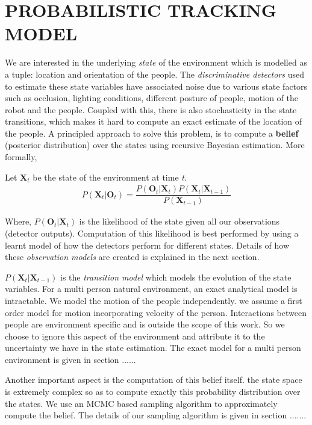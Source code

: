 \section{PROBABILISTIC TRACKING MODEL}
We are interested in the underlying \textit{state} of the environment which is modelled as a tuple: location and orientation of the people. The \textit{discriminative detectors} used to estimate these state variables have associated noise due to various state factors such as occlusion, lighting conditions, different posture of people, motion of the robot and the people. Coupled with this, there is also stochasticity in the state transitions, which makes it hard to compute an exact estimate of the location of the people. A principled approach to solve this problem, is to compute a \textbf{belief} (posterior distribution) over the states using recursive Bayesian estimation. More formally,

Let $\textbf{X}_{t}$ be the state of the environment at time \textit{t}.
\begin{align}
P(\textbf{X}_{t} | \textbf{O}_{t}) = \dfrac{P(\textbf{O}_{t} | \textbf{X}_{t}) P(\textbf{X}_{t}|\textbf{X}_{t-1})} {P(\textbf{X}_{t-1})}
\end{align} 

Where, $P(\textbf{O}_{t} | \textbf{X}_{t})$ is the likelihood of the state given all our observations (detector outputs). Computation of this likelihood is best performed by using a learnt model of how the detectors perform for different states. Details of how these \textit{observation models} are created is explained in the next section.

$P(\textbf{X}_{t}|\textbf{X}_{t-1})$ is the \textit{transition model} which models the evolution of the state variables. For a multi person natural environment, an exact analytical model is intractable. We model the motion of the people independently. we assume a first order model for motion incorporating velocity of the person. Interactions between people are environment specific and is outside the scope of this work. So we choose to ignore this aspect of the environment and attribute it to the uncertainty we have in the state estimation. The exact model for a multi person environment is given in section ......

Another important aspect is the computation of this belief itself. the state space is extremely complex so as to compute exactly this probability 
distribution over the states. We use an MCMC based sampling algorithm to approximately compute the belief. The details of our sampling algorithm is given in section .......

